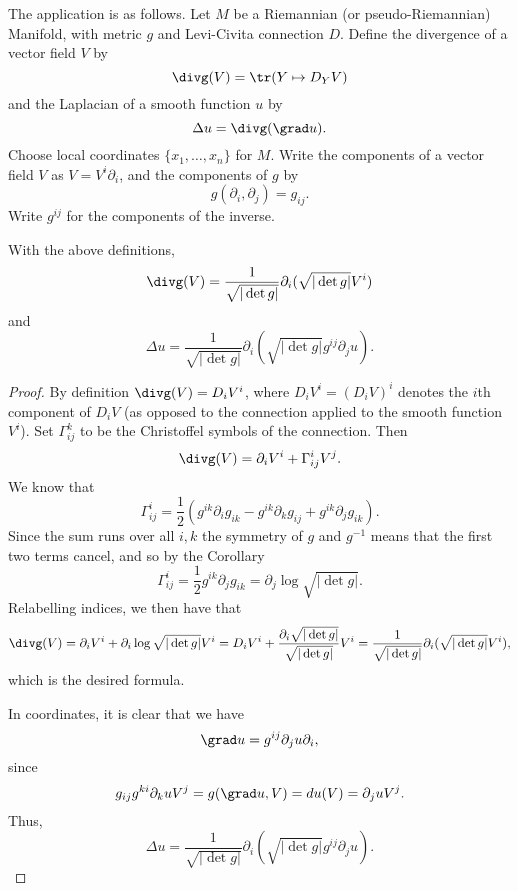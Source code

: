 \documentclass[12pt]{article}
\begin{document}
The application is as follows. Let $M$ be a Riemannian (or pseudo-Riemannian) Manifold, with metric $g$ and Levi-Civita connection $D$. Define the divergence of a vector field $V$ by
\[\divg(V) = \tr(Y\mapsto D_Y V)\]
and the Laplacian of a smooth function $u$ by
\[\Delta u = \divg(\grad u).\]
Choose local coordinates $\{x_1,\ldots,x_n\}$ for $M$.
Write the components of a vector field $V$ as $V = V^i\partial_i$, and the components of $g$ by
\[g(\partial_i,\partial_j) = g_{ij}.\] Write $g^{ij}$ for the components of the inverse.
\begin{prop}With the above definitions,
\[\divg(V) = \frac{1}{\sqrt{|\det g|}}\partial_i(\sqrt{|\det g|}V^i)\]
and
\[\Delta u = \frac{1}{\sqrt{|\det g|}}\partial_i(\sqrt{|\det g|}g^{ij}\partial_j u).\]\end{prop}
\begin{proof}
By definition $\divg(V)  = D_iV^i$, where $D_iV^i = (D_iV)^i$ denotes the $i$th component of $D_iV$ (as opposed to the connection applied to the smooth function $V^i$). Set $\Gamma_{ij}^k$ to be the Christoffel symbols of the connection. Then
\[\divg(V) = \partial_iV^i +\Gamma_{ij}^iV^j.\]
We know that
\[\Gamma_{ij}^i = \frac{1}{2}\left(g^{ik}\partial_i g_{ik}-g^{ik}\partial_k g_{ij} + g^{ik}\partial_j g_{ik}\right).\] Since the sum runs over all $i,k$ the symmetry of $g$ and $g^{-1}$ means that the first two terms cancel, and so by the Corollary
\[\Gamma_{ij}^i = \frac{1}{2}g^{ik}\partial_j g_{ik} = \partial_j\log \sqrt{|\det g|}.\]
Relabelling indices, we then have that
\[\divg(V) = \partial_iV^i + \partial_i\log \sqrt{|\det g|}V^i = D_iV^i + \frac{\partial_i \sqrt{|\det g|}}{\sqrt{|\det g|}}V^i = \frac{1}{\sqrt{|\det g|}}\partial_i(\sqrt{|\det g|}V^i),\]
which is the desired formula.

In coordinates, it is clear that we have
\[\grad u = g^{ij}\partial_j u \partial_i,\]
since
\[g_{ij}g^{ki}\partial_k u V^j = g(\grad u,V) = du(V) = \partial_j u V^j.\]
Thus,
\[\Delta u = \frac{1}{\sqrt{|\det g|}}\partial_i(\sqrt{|\det g|}g^{ij}\partial_j u).\]
\end{proof}
\end{document}
